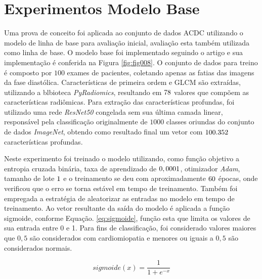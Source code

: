 \section{Experimentos Modelo Base}
\label{sec:cap5_experimentos_base}

Uma prova de conceito foi aplicada ao conjunto de dados \gls{ACDC} utilizando o modelo de linha de base para avaliação inicial, avaliação esta também utilizada como linha de base. O modelo base foi implementado seguindo o artigo e sua implementação é conferida na Figura \ref{fig:fig008}. O conjunto de dados para treino é composto por $100$ exames de pacientes, coletando apenas as fatias das imagens da fase diastólica. Características de primeira ordem e \gls{GLCM} são extraídas, utilizando a blbioteca \textit{PyRadiomics}, resultando em $78$ valores que compõem as características radiômicas. Para extração das características profundas, foi utilizado uma rede \textit{ResNet50} congelada sem sua última camada linear, responsável pela classificação originalmente de $1000$ classes oriundas do conjunto de dados \textit{ImageNet}, obtendo como resultado final um vetor com $100.352$ características profundas.


Neste experimento foi treinado o modelo utilizando, como função objetivo a entropia cruzada binária, taxa de aprendizado de $0,0001$, otimizador \textit{Adam}, tamanho de lote $1$ e o treinamento se deu com aproximadamente $60$ épocas, onde verificou que o erro se torna estável em tempo de treinamento. Também foi empregada a estratégia de aleatorizar as entradas no modelo em tempo de treinamento. Ao vetor resultante da saída do modelo é aplicada a função sigmoide, conforme Equação. \ref{eq:sigmoide}, função esta que limita os valores de sua entrada entre 0 e 1. Para fins de classificação, foi considerado valores maiores que $0,5$ são considerados com cardiomiopatia e menores ou iguais a $0,5$ são considerados normais.

\begin{equation}
\textit{sigmoide}(x) = \frac{1}{1 + e^{-x}}
\label{eq:sigmoide}
\end{equation}

